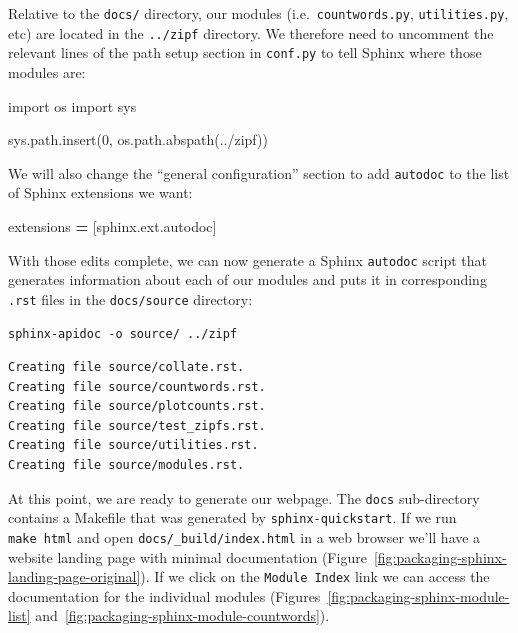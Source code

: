 \documentclass[
]{krantz}
\makeatletter
\newenvironment{Shaded}{\begin{snugshade}}{\end{snugshade}}
\newcommand{\DecValTok}[1]{\textcolor[rgb]{0.00,0.00,0.81}{#1}}
\newcommand{\ImportTok}[1]{#1}
\newcommand{\NormalTok}[1]{#1}
\newcommand{\OperatorTok}[1]{\textcolor[rgb]{0.81,0.36,0.00}{\textbf{#1}}}
\newcommand{\StringTok}[1]{\textcolor[rgb]{0.31,0.60,0.02}{#1}}
\newenvironment{kframe}{%
\medskip{}
\setlength{\fboxsep}{.8em}
 \def\at@end@of@kframe{}%
 \ifinner\ifhmode%
  \def\at@end@of@kframe{\end{minipage}}%
  \begin{minipage}{\columnwidth}%
 \fi\fi%
 \def\FrameCommand##1{\hskip\@totalleftmargin \hskip-\fboxsep
 \colorbox{shadecolor}{##1}\hskip-\fboxsep
     \hskip-\linewidth \hskip-\@totalleftmargin \hskip\columnwidth}%
 \MakeFramed {\advance\hsize-\width
   \@totalleftmargin\z@ \linewidth\hsize
   \@setminipage}}%
 {\par\unskip\endMakeFramed%
 \at@end@of@kframe}
\renewenvironment{Shaded}{\begin{kframe}}{\end{kframe}}
\makeatother
\begin{document}
Relative to the \texttt{docs/} directory,
our modules (i.e.~\texttt{countwords.py}, \texttt{utilities.py}, etc) are located in the \texttt{../zipf} directory.
We therefore need to uncomment the relevant lines of the path setup section in \texttt{conf.py}
to tell Sphinx where those modules are:

\begin{Shaded}
\begin{Highlighting}[]
\ImportTok{import}\NormalTok{ os}
\ImportTok{import}\NormalTok{ sys}

\NormalTok{sys.path.insert(}\DecValTok{0}\NormalTok{, os.path.abspath(}\StringTok{\textquotesingle{}../zipf\textquotesingle{}}\NormalTok{))}
\end{Highlighting}
\end{Shaded}

We will also change the ``general configuration'' section
to add \texttt{autodoc} to the list of Sphinx extensions we want:

\begin{Shaded}
\begin{Highlighting}[]
\NormalTok{extensions }\OperatorTok{=}\NormalTok{ [}\StringTok{\textquotesingle{}sphinx.ext.autodoc\textquotesingle{}}\NormalTok{]}
\end{Highlighting}
\end{Shaded}

With those edits complete,
we can now generate a Sphinx \texttt{autodoc} script
that generates information about each of our modules
and puts it in corresponding \texttt{.rst} files in the \texttt{docs/source} directory:

\begin{verbatim}
sphinx-apidoc -o source/ ../zipf
\end{verbatim}

\begin{verbatim}
Creating file source/collate.rst.
Creating file source/countwords.rst.
Creating file source/plotcounts.rst.
Creating file source/test_zipfs.rst.
Creating file source/utilities.rst.
Creating file source/modules.rst.
\end{verbatim}

At this point, we are ready to generate our webpage.
The \texttt{docs} sub-directory contains a Makefile that was generated by \texttt{sphinx-quickstart}.
If we run \texttt{make\ html} and open \texttt{docs/\_build/index.html} in a web browser
we'll have a website landing page with minimal documentation (Figure~\ref{fig:packaging-sphinx-landing-page-original}).
If we click on the \texttt{Module\ Index} link we can access the documentation for the individual modules
(Figures~\ref{fig:packaging-sphinx-module-list} and~\ref{fig:packaging-sphinx-module-countwords}).
\end{document}
